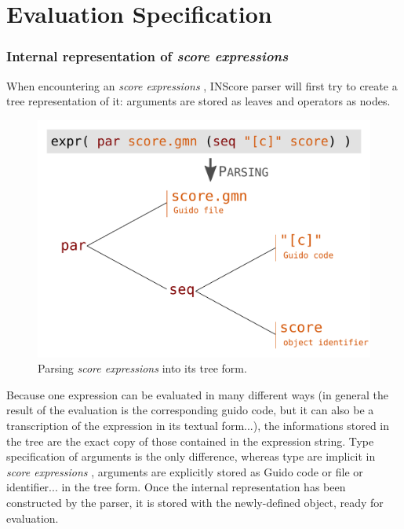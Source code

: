 \documentclass{article}
\newcommand{\sExpr}{\emph{score expressions} }
\begin{document}
\section{Evaluation Specification}


\subsubsection{Internal representation of \sExpr}

When encountering an \sExpr, INScore parser will first try to create a tree representation of it: arguments are stored as leaves and operators as nodes.

\begin{figure}[th]
\centering
\includegraphics[width=0.9\columnwidth]{imgs/exprParse}
\caption{Parsing \sExpr into its tree form.
\label{fig:example}}
\end{figure}

Because one expression can be evaluated in many different ways (in general the result of the evaluation is the corresponding guido code, but it can also be a transcription of the expression in its textual form...), the informations stored in the tree are the exact copy of those contained in the expression string. Type specification of arguments is the only difference, whereas type are implicit in \sExpr, arguments are explicitly stored as Guido code or file or identifier... in the tree form. Once the internal representation has been constructed by the parser, it is stored with the newly-defined object, ready for evaluation.
\end{document}
